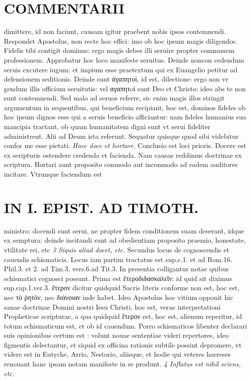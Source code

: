 \documentclass{article}
\begin{document}
\begin{pages}
\section*{COMMENTARII }
\marginpar{[ p.148 ]}\pstart dimittere, id non faciunt, causam igitur praebent nobis ipsos contemnendi. Respondet Apostolus, non recte hoc effici: imo ob hoc ipsum magis diligendos. Fidelis tibi contigit dominus: ergo magis debes illi seruire propter communem professionem. Approbatur hoc loco manifeste seruitus. Deinde noncon cedendum seruis excutere iugum: et impium esse praetextum qui ex Euangelio petitur ad defensionem seditionis. Deinde sunt ἀγαπητοὶ, id est, dilectione: ergo non vr gendum illis officium seruitutis: vel αγαπητoὶ sunt Deo et Christo: ideo abs te non sunt contemnendi. Sed malo ad seruos referre, sic enim magis illos stringit argumentum in sequentibus, qui beneficium recipiant, hoc est, dominos fideles ob hoc ipsum dignos esse qui a seruis beneficio afficiantur: nam fideles humanius sua mancipia tractant, ob quam humanitatem digni sunt vt serui fideliter administrent. Alii ad Deum ista referunt. Sequatur quisque quod sibi videbitur confor me esse pietati.  \pend
\textit{Haec doce et hortare. }\pstart Conclusio est loci prioris. Docere est ex seripturis ostendere credenda et facienda. Nam causas reddimus doctrinae ex scriptura. Hortari aunt proposito conmodo aut inconmodo ad eadem auditores incitare. Vtrunque faciendum est  \pend
\section*{IN I. EPIST. AD TIMOTH. }
\marginpar{[ p.149 ]}\pstart ministro: docendi sunt serui, ne propter fidem conditionem suam deserant, idque ex semptura: deinde incitandi sunt ad obedientiam proposito praemio, honestate, vtilitate rei, etc  \pend
\textit{3 Siquis aliud docet, etc. }\pstart Secundus locus de cognoscendis et cauendis schismaticis. Locus iam partim tractatus est sup.c.1. et ad Rom.16. Phil.3. et 2. ad Tim.3. vers.6.ad Tit.3. In presentia colligantur notae quibus schismatici cognosci possunt.  \pend\pstart Prima est ἔτεροδιδασκαλεῖν: id quid sit diximus sup.cap.1.ver.3. ἕτερον dicitur quidquid Sacris literis conforme non est, hoc est, nec τὸ ῥητόν, nec διάνοιαν inde habet. Ideo Apostolus hoc vitium opponit hic sanae doctrinae Domini nostri Iesu Christi, hoc est, verae interpretationi Propheticae scripturae, a qua quidquid ἕτερον est, hoc est, alienum reperitur, id totum schismaticum est, et ob id cauendum. Porro schismaticos libenter declarari suis opinionibus certum est : volunt nouae sententiae videri repertores, ideo figmentis delectantur, et siquid ex officina rationis subtile possint depromere, vt videre est in Eutyche, Arrio, Nestorio, aliisque, et hodie qui veteres haereses renouant hanc ipsam notam manifeste in se produnt.  \pend
\textit{4 Inflatus est nihil sciens, etc. }

\end{pages}
\end{document}
